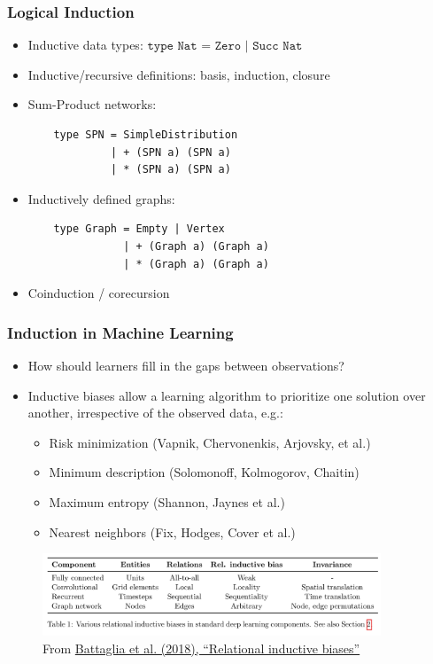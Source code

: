 \documentclass{beamer}
\begin{document}
\begin{frame}[fragile]
  \frametitle{Logical Induction}
  \begin{itemize}
    \item Inductive data types: $\texttt{type Nat = Zero | Succ Nat}$
    \item Inductive/recursive definitions: basis, induction, closure
    \item Sum-Product networks:
    \begin{lstlisting}
    type SPN = SimpleDistribution
             | + (SPN a) (SPN a)
             | * (SPN a) (SPN a)
    \end{lstlisting}
    \item Inductively defined graphs:
    \begin{lstlisting}
    type Graph = Empty | Vertex
               | + (Graph a) (Graph a)
               | * (Graph a) (Graph a)
    \end{lstlisting}
    \item Coinduction / corecursion
  \end{itemize}
\end{frame}

\begin{frame}
  \frametitle{Induction in Machine Learning}
  \begin{itemize}
    \item How should learners fill in the gaps between observations?
    \item Inductive biases allow a learning algorithm to prioritize one solution over another, irrespective of the observed data, e.g.:
    \begin{itemize}
      \item Risk minimization (Vapnik, Chervonenkis, Arjovsky, et al.)
      \item Minimum description (Solomonoff, Kolmogorov, Chaitin)
      \item Maximum entropy (Shannon, Jaynes et al.)
      \item Nearest neighbors (Fix, Hodges, Cover et al.)
      \end{itemize}
  \end{itemize}
  \begin{figure}[H]
    \centering
    \includegraphics[width=0.9\textwidth]{../../clipart/relational_inductive_biases.jpg}
    \caption{From \href{https://arxiv.org/pdf/1806.01261.pdf}{Battaglia et al. (2018), ``Relational inductive biases''}}
  \end{figure}
\end{frame}
\end{document}
